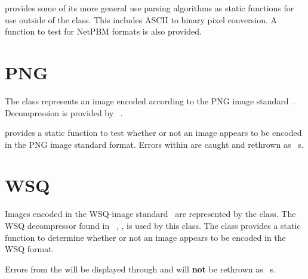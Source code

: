  provides some of its more general use parsing algorithms as
static functions for use outside of the class.  This includes ASCII to binary
pixel conversion.  A function to test for NetPBM formats is also provided.

\section{PNG}
\label{sec-image-png}
The  class represents an image encoded according to the PNG image 
standard~\cite{png}.  Decompression is provided by 
~\cite{libpng}.

 provides a static function to test whether or not an image appears
to be encoded in the PNG image standard format.  Errors within 
are caught and rethrown as ~s.

\section{WSQ}
\label{sec-image-wsq}
Images encoded in the WSQ-image standard~\cite{wsq} are represented by the 
 class.  The WSQ decompressor found in \nbis~\cite{nbis}, 
, is used by this class.  The class provides a static function to determine whether or not an image appears to be encoded in the WSQ format.

Errors from the  will be displayed through 
and will {\bf not} be rethrown as ~s.
